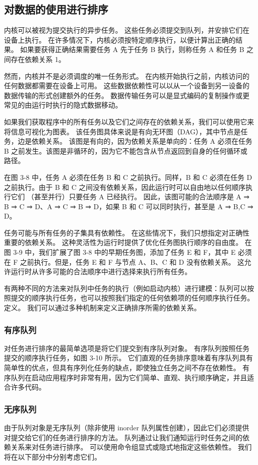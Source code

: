 \subsection{对数据的使用进行排序}
内核可以被视为提交执行的异步任务。 这些任务必须提交到队列，并安排它们在设备上执行。 在许多情况下，内核必须按特定顺序执行，以便计算出正确的结果。 如果要获得正确结果需要任务 A 先于任务 B 执行，则称任务 A 和任务 B 之间存在依赖关系 1。

然而，内核并不是必须调度的唯一任务形式。 在内核开始执行之前，内核访问的任何数据都需要在设备上可用。 这些数据依赖性可以以从一个设备到另一设备的数据传输的形式创建额外的任务。 数据传输任务可以是显式编码的复制操作或更常见的由运行时执行的隐式数据移动。

如果我们获取程序中的所有任务以及它们之间存在的依赖关系，我们可以使用它来将信息可视化为图表。 该任务图具体来说是有向无环图（DAG），其中节点是任务，边是依赖关系。 该图是有向的，因为依赖关系是单向的：任务 A 必须在任务 B 之前发生。该图是非循环的，因为它不能包含从节点返回到自身的任何循环或路径。

在图 3-8 中，任务 A 必须在任务 B 和 C 之前执行。同样，B 和 C 必须在任务 D 之前执行。由于 B 和 C 之间没有依赖关系，因此运行时可以自由地以任何顺序执行它们 （甚至并行）只要任务 A 已经执行。 因此，该图可能的合法顺序是 A ⇒ B ⇒ C ⇒ D、A ⇒ C ⇒ B ⇒ D，如果 B 和 C 可以同时执行，甚至是 A ⇒ {B,C} ⇒ D。

任务可能与所有任务的子集具有依赖性。 在这些情况下，我们只想指定对正确性重要的依赖关系。 这种灵活性为运行时提供了优化任务图执行顺序的自由度。 在图 3-9 中，我们扩展了图 3-8 中的早期任务图，添加了任务 E 和 F，其中 E 必须在 F 之前执行。但是，任务 E 和 F 与节点 A、B、C 和 D 没有依赖关系。 这允许运行时从许多可能的合法顺序中进行选择来执行所有任务。

有两种不同的方法来对队列中任务的执行（例如启动内核）进行建模：队列可以按照提交的顺序执行任务，也可以按照我们指定的任何依赖项的任何顺序执行任务。 定义。 我们可以通过多种机制来定义正确排序所需的依赖关系。

\subsubsection{有序队列}
对任务进行排序的最简单选项是将它们提交到有序队列对象。 有序队列按照任务提交的顺序执行任务，如图 3-10 所示。 它们直观的任务排序意味着有序队列具有简单性的优点，但具有序列化任务的缺点，即使独立任务之间不存在依赖性。 有序队列在启动应用程序时非常有用，因为它们简单、直观、执行顺序确定，并且适合许多代码。

\subsubsection{无序队列}
由于队列对象是无序队列（除非使用 inorder 队列属性创建），因此它们必须提供对提交给它们的任务进行排序的方法。 队列通过让我们通知运行时任务之间的依赖关系来对任务进行排序。 可以使用命令组显式或隐式地指定这些依赖性。 我们将在以下部分中分别考虑它们。

